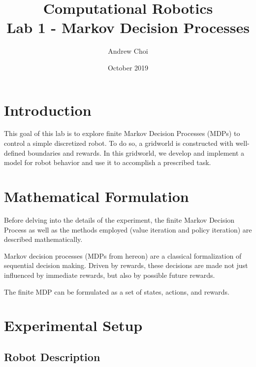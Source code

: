 \documentclass[fullpage]{article}
\title{\textbf{Computational Robotics} \\ \large Lab 1 - Markov Decision Processes}
\author{Andrew Choi}
\date{October 2019}
\begin{document}
\maketitle

\section{Introduction}

This goal of this lab is to explore finite Markov Decision Processes (MDPs) to control a simple discretized robot. To do so, a gridworld is constructed with well-defined boundaries and rewards. In this gridworld, we develop and implement a model for robot behavior and use it to accomplish a prescribed task.

\section{Mathematical Formulation}

Before delving into the details of the experiment, the finite Markov Decision Process as well as the methods employed (value iteration and policy iteration) are described mathematically.

Markov decision processes (MDPs from hereon) are a classical formalization of sequential decision making. Driven by rewards, these decisions are made not just influenced by immediate rewards, but also by possible future rewards.

The finite MDP can be formulated as a set of states, actions, and rewards.

\section{Experimental Setup}

\subsection{Robot Description}
\end{document}
